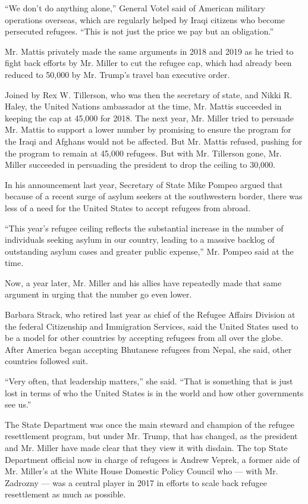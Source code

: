 ``We don't do anything alone,'' General Votel said of American military
operations overseas, which are regularly helped by Iraqi citizens who
become persecuted refugees. ``This is not just the price we pay but an
obligation.''

Mr. Mattis privately made the same arguments in 2018 and 2019 as he
tried to fight back efforts by Mr. Miller to cut the refugee cap, which
had already been reduced to 50,000 by Mr. Trump's travel ban executive
order.

Joined by Rex W. Tillerson, who was then the secretary of state, and
Nikki R. Haley, the United Nations ambassador at the time, Mr. Mattis
succeeded in keeping the cap at 45,000 for 2018. The next year, Mr.
Miller tried to persuade Mr. Mattis to support a lower number by
promising to ensure the program for the Iraqi and Afghans would not be
affected. But Mr. Mattis refused, pushing for the program to remain at
45,000 refugees. But with Mr. Tillerson gone, Mr. Miller succeeded in
persuading the president to drop the ceiling to 30,000.

In his announcement last year, Secretary of State Mike Pompeo argued
that because of a recent surge of asylum seekers at the southwestern
border, there was less of a need for the United States to accept
refugees from abroad.

``This year's refugee ceiling reflects the substantial increase in the
number of individuals seeking asylum in our country, leading to a
massive backlog of outstanding asylum cases and greater public
expense,'' Mr. Pompeo said at the time.

Now, a year later, Mr. Miller and his allies have repeatedly made that
same argument in urging that the number go even lower.

Barbara Strack, who retired last year as chief of the Refugee Affairs
Division at the federal Citizenship and Immigration Services, said the
United States used to be a model for other countries by accepting
refugees from all over the globe. After America began accepting
Bhutanese refugees from Nepal, she said, other countries followed suit.

``Very often, that leadership matters,'' she said. ``That is something
that is just lost in terms of who the United States is in the world and
how other governments see us.''

The State Department was once the main steward and champion of the
refugee resettlement program, but under Mr. Trump, that has changed, as
the president and Mr. Miller have made clear that they view it with
disdain. The top State Department official now in charge of refugees is
Andrew Veprek, a former aide of Mr. Miller's at the White House Domestic
Policy Council who --- with Mr. Zadrozny --- was a central player in
2017 in efforts to scale back refugee resettlement as much as possible.

